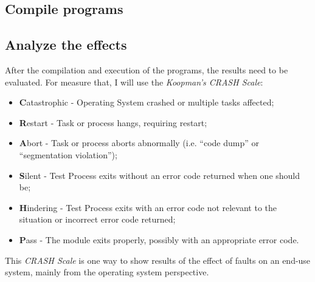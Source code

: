 \subsection{Compile programs}



\subsection{Analyze the effects}


After the compilation and execution of the programs, the results need to be evaluated. For measure that, I will use the \textit{Koopman's CRASH Scale}\cite{koopman1997comparing}:

\begin{itemize}
	\item \textbf{C}atastrophic - Operating System crashed or multiple tasks affected;
	\item \textbf{R}estart - Task or process hangs, requiring restart;
	\item \textbf{A}bort - Task or process aborts abnormally (i.e. ``code dump'' or ``segmentation violation'');
	\item \textbf{S}ilent - Test Process exits without an error code returned when one should be;
	\item \textbf{H}indering - Test Process exits with an error code not relevant to the situation or incorrect error code returned;
	\item \textbf{P}ass - The module exits properly, possibly with an appropriate error code.
\end{itemize}

This \textit{CRASH Scale} is one way to show results of the effect of faults on an end-use system, mainly from the operating system perspective.

